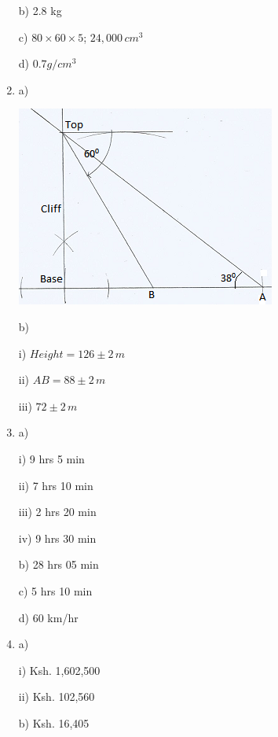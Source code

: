 \documentclass[
  a4paperpaper,
]{scrbook}
\begin{document}
\begin{tcolorbox}
\begin{enumerate}
  b) 2.8 kg

  c) \(80\times60\times5\); \(24,000\,cm^3\)

  d) \(0.7 g/cm^3\)
\item
  a)

  \includegraphics{figures/Md10_N19.png}

  b)

  i) \(Height=126\pm2\,m\)

  ii) \(AB=88\pm2\,m\)

  iii) \(72\pm2\,m\)
\item
  a)

  i) 9 hrs 5 min

  ii) 7 hrs 10 min

  iii) 2 hrs 20 min

  iv) 9 hrs 30 min

  b) 28 hrs 05 min

  c) 5 hrs 10 min

  d) 60 km/hr
\item
  a)

  i) Ksh. 1,602,500

  ii) Ksh. 102,560

  b) Ksh. 16,405
\end{enumerate}

\end{tcolorbox}


\backmatter
\end{document}
